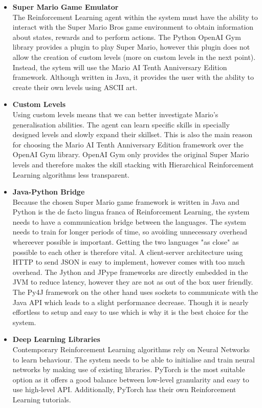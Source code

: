 \documentclass[notitlepage,a4paper,11pt]{article}
\begin{document}
\begin{itemize}

	\item \textbf{Super Mario Game Emulator}\\ 
	The Reinforcement Learning agent within the system must have the ability to interact with the Super Mario Bros game environment to obtain information about states, rewards and to perform actions. The Python OpenAI Gym library provides a plugin to play Super Mario, however this plugin does not allow the creation of custom levels (more on custom levels in the next point). Instead, the sytem will use the Mario AI Tenth Anniversary Edition \cite{marioai} framework. Although written in Java, it provides the user with the ability to create their own levels using ASCII art.
	
	\item \textbf{Custom Levels}\\
	Using custom levels means that we can better investigate Mario's generalisation abilities. The agent can learn specific skills in specially designed levels and slowly expand their skillset. This is also the main reason for choosing the Mario AI Tenth Anniversary Edition framework over the OpenAI Gym library. OpenAI Gym only provides the original Super Mario levels and therefore makes the skill stacking with Hierarchical Reinforcement Learning algorithms less transparent.
	
	\item \textbf{Java-Python Bridge}\\
	Because the chosen Super Mario game framework is written in Java and Python is the de facto lingua franca of Reinforcement Learning, the system needs to have a communication bridge between the languages. The system needs to train for longer periods of time, so avoiding unnecessary overhead whereever possible is important. Getting the two languages "as close" as possible to each other is therefore vital. A client-server architecture using HTTP to send JSON is easy to implement, however comes with too much overhead. The Jython \cite{jython} and JPype \cite{jpype} frameworks are directly embedded in the JVM to reduce latency, however they are not as out of the box user friendly. The Py4J \cite{py4j} framework on the other hand uses sockets to communicate with the Java API which leads to a slight performance decrease. Though it is nearly effortless to setup and easy to use which is why it is the best choice for the system.
	
	\item \textbf{Deep Learning Libraries}\\
	Contemporary Reinforcement Learning algorithms rely on Neural Networks to learn behaviour. The system needs to be able to initialise and train neural networks by making use of existing libraries. PyTorch is the most suitable option as it offers a good balance between low-level granularity and easy to use high-level API. Additionally, PyTorch has their own Reinforcement Learning tutorials.
	

\end{itemize}
\end{document}
